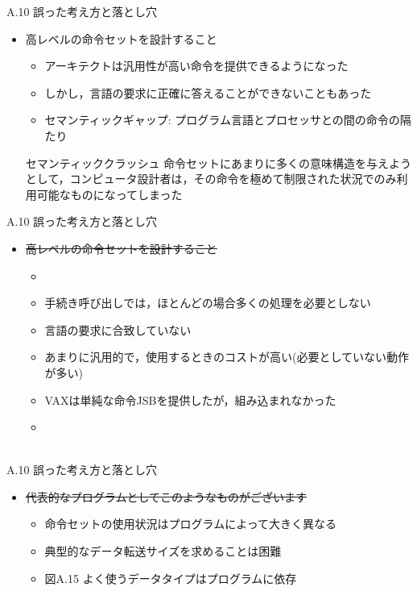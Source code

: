 \documentclass[dvipdfmx]{beamer}
\begin{document}
	\begin{frame}{A.10 誤った考え方と落とし穴}
		\begin{itemize}
			\item 高レベルの命令セットを設計すること
				\begin{itemize}
			\item アーキテクトは汎用性が高い命令を提供できるようになった
			\item しかし，言語の要求に正確に答えることができないこともあった
			\item セマンティックギャップ: プログラム言語とプロセッサとの間の命令の隔たり
				\end{itemize}
				\begin{alertblock}{セマンティッククラッシュ}
					命令セットにあまりに多くの意味構造を与えようとして，コンピュータ設計者は，その命令を極めて制限された状況でのみ利用可能なものになってしまった
				\end{alertblock}
		\end{itemize}
	\end{frame}

	\begin{frame}{A.10 誤った考え方と落とし穴}
		\begin{itemize}
			\item \sout{高レベルの命令セットを設計すること}
				\begin{itemize}
					\item {}
					\item 手続き呼び出しでは，ほとんどの場合多くの処理を必要としない
					\item 言語の要求に合致していない
					\item あまりに汎用的で，使用するときのコストが高い(必要としていない動作が多い)
					\item VAXは単純な命令JSBを提供したが，組み込まれなかった
					\item {}\\
						\\
				\end{itemize}
		\end{itemize}
	\end{frame}

	\begin{frame}{A.10 誤った考え方と落とし穴}
		\begin{itemize}
			\item \sout{代表的なプログラムとしてこのようなものがございます}
				\begin{itemize}
					\item 命令セットの使用状況はプログラムによって大きく異なる
					\item 典型的なデータ転送サイズを求めることは困難
					\item 図A.15 よく使うデータタイプはプログラムに依存
				\end{itemize}
		\end{itemize}
	\end{frame}
\end{document}
